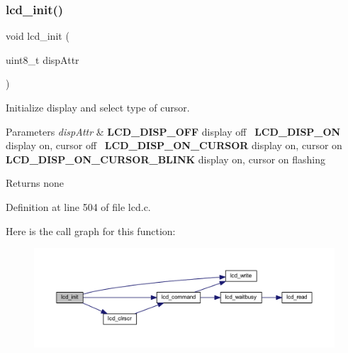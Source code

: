 \subsubsection{\texorpdfstring{lcd\_init()}{lcd\_init()}}
{\footnotesize\ttfamily void lcd\+\_\+init (\begin{DoxyParamCaption}\item[{uint8\+\_\+t}]{disp\+Attr }\end{DoxyParamCaption})}



Initialize display and select type of cursor. 


\begin{DoxyParams}{Parameters}
{\em disp\+Attr} & {\bfseries{L\+C\+D\+\_\+\+D\+I\+S\+P\+\_\+\+O\+FF}} display off~\newline
 {\bfseries{L\+C\+D\+\_\+\+D\+I\+S\+P\+\_\+\+ON}} display on, cursor off~\newline
 {\bfseries{L\+C\+D\+\_\+\+D\+I\+S\+P\+\_\+\+O\+N\+\_\+\+C\+U\+R\+S\+OR}} display on, cursor on~\newline
 {\bfseries{L\+C\+D\+\_\+\+D\+I\+S\+P\+\_\+\+O\+N\+\_\+\+C\+U\+R\+S\+O\+R\+\_\+\+B\+L\+I\+NK}} display on, cursor on flashing\\
\hline
\end{DoxyParams}
\begin{DoxyReturn}{Returns}
none 
\end{DoxyReturn}


Definition at line 504 of file lcd.\+c.

Here is the call graph for this function\+:\nopagebreak
\begin{figure}[H]
\begin{center}
\leavevmode
\includegraphics[width=350pt]{group__pfleury__lcd_ga9af28b2779326b63ff4356e2b1828984_cgraph}
\end{center}
\end{figure}
\mbox{\label{group__pfleury__lcd_gafa7e36b95c43d603f510273ad077cbbe}} 
